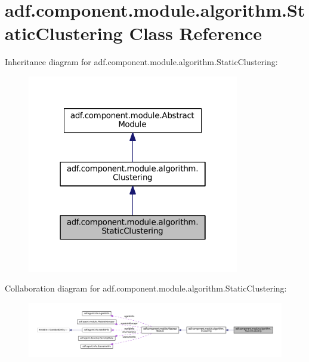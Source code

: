 \hypertarget{classadf_1_1component_1_1module_1_1algorithm_1_1StaticClustering}{}\section{adf.\+component.\+module.\+algorithm.\+Static\+Clustering Class Reference}
\label{classadf_1_1component_1_1module_1_1algorithm_1_1StaticClustering}


Inheritance diagram for adf.\+component.\+module.\+algorithm.\+Static\+Clustering\+:
\nopagebreak
\begin{figure}[H]
\begin{center}
\leavevmode
\includegraphics[width=262pt]{classadf_1_1component_1_1module_1_1algorithm_1_1StaticClustering__inherit__graph}
\end{center}
\end{figure}


Collaboration diagram for adf.\+component.\+module.\+algorithm.\+Static\+Clustering\+:
\nopagebreak
\begin{figure}[H]
\begin{center}
\leavevmode
\includegraphics[width=350pt]{classadf_1_1component_1_1module_1_1algorithm_1_1StaticClustering__coll__graph}
\end{center}
\end{figure}
